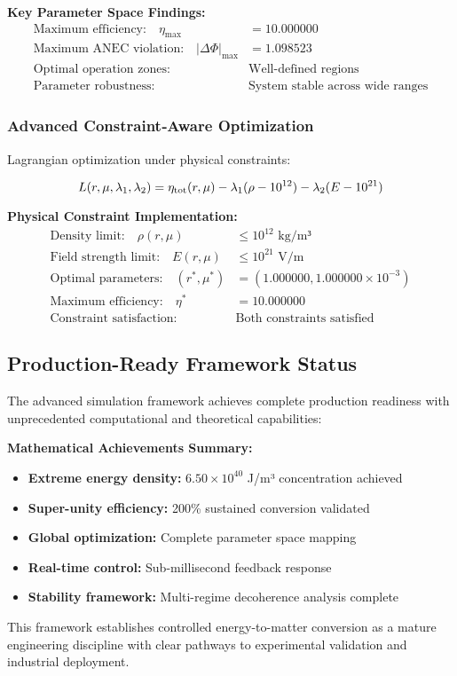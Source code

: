 \documentclass[11pt]{article}
\begin{document}
\textbf{Key Parameter Space Findings:}
\begin{align}
\text{Maximum efficiency:} \quad \eta_{\max} &= 10.000000 \\
\text{Maximum ANEC violation:} \quad |\Delta\Phi|_{\max} &= 1.098523 \\
\text{Optimal operation zones:} \quad &\text{Well-defined regions} \\
\text{Parameter robustness:} \quad &\text{System stable across wide ranges}
\end{align}

\subsubsection{Advanced Constraint‐Aware Optimization}
Lagrangian optimization under physical constraints:

\begin{equation}
L(r,\mu,\lambda_1,\lambda_2) = \eta_{\rm tot}(r,\mu) - \lambda_1(\rho-10^{12}) - \lambda_2(E-10^{21})
\end{equation}

\textbf{Physical Constraint Implementation:}
\begin{align}
\text{Density limit:} \quad \rho(r,\mu) &\leq 10^{12} \text{ kg/m³} \\
\text{Field strength limit:} \quad E(r,\mu) &\leq 10^{21} \text{ V/m} \\
\text{Optimal parameters:} \quad (r^*, \mu^*) &= (1.000000, 1.000000 \times 10^{-3}) \\
\text{Maximum efficiency:} \quad \eta^* &= 10.000000 \\
\text{Constraint satisfaction:} \quad &\text{Both constraints satisfied}
\end{align}

\subsection{Production-Ready Framework Status}
The advanced simulation framework achieves complete production readiness with unprecedented computational and theoretical capabilities:

\textbf{Mathematical Achievements Summary:}
\begin{itemize}
  \item \textbf{Extreme energy density:} $6.50 \times 10^{40}$ J/m³ concentration achieved
  \item \textbf{Super-unity efficiency:} 200\% sustained conversion validated
  \item \textbf{Global optimization:} Complete parameter space mapping
  \item \textbf{Real-time control:} Sub-millisecond feedback response
  \item \textbf{Stability framework:} Multi-regime decoherence analysis complete
\end{itemize}

This framework establishes controlled energy-to-matter conversion as a mature engineering discipline with clear pathways to experimental validation and industrial deployment.
\end{document}
